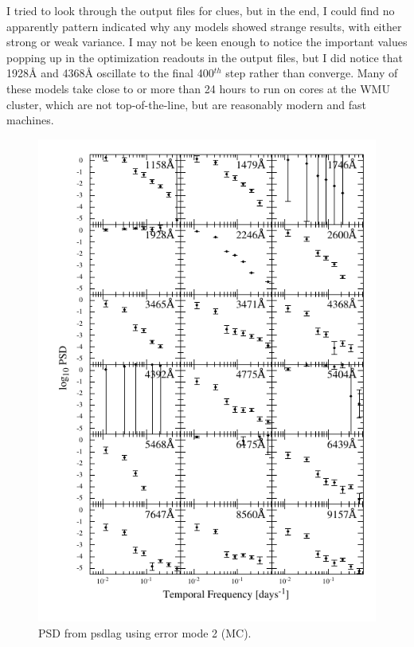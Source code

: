 \documentclass[11pt,letterpaper]{article}
\begin{document}
I tried to look through the output files for clues, but in the end, I could find no apparently pattern indicated why any models showed strange results, with either strong or weak variance. I may not be keen enough to notice the important values popping up in the optimization readouts in the output files, but I did notice that 1928\AA$ $ and 4368\AA$ $ oscillate to the final 400$^{th}$ step rather than converge. Many of these models take close to or more than 24 hours to run on cores at the WMU cluster, which are not top-of-the-line, but are reasonably modern and fast machines.


\begin{figure}
    \label{fig:psd_err2}
    \centering
    \includegraphics{../img/psd_atlas_err2.pdf}
    \caption{PSD from psdlag using error mode 2 (MC).}
\end{figure}
\end{document}
